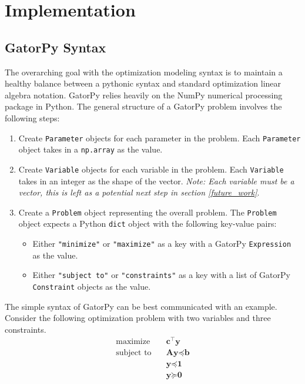 \documentclass[conference]{IEEEtran}
\begin{document}
\section{Implementation}

\subsection{GatorPy Syntax}
The overarching goal with the optimization modeling syntax is to maintain a healthy balance between a pythonic syntax and standard optimization linear algebra notation.
GatorPy relies heavily on the NumPy numerical processing package in Python.
The general structure of a GatorPy problem involves the following steps:
\begin{enumerate}
    \item Create \texttt{Parameter} objects for each parameter in the problem.
    Each \texttt{Parameter} object takes in a \texttt{np.array} as the value.
    \item Create \texttt{Variable} objects for each variable in the problem.
    Each \texttt{Variable} takes in an integer as the shape of the vector.
    \textit{Note: Each variable must be a vector, this is left as a potential next step in section \ref{future_work}}.
    \item Create a \texttt{Problem} object representing the overall problem.
    The \texttt{Problem} object expects a Python \texttt{dict} object with the following key-value pairs:
    \begin{itemize}
        \item Either \texttt{"minimize"} or \texttt{"maximize"} as a key with a GatorPy \texttt{Expression} as the value.
        \item Either \texttt{"subject to"} or \texttt{"constraints"} as a key with a list of GatorPy \texttt{Constraint} objects as the value.
    \end{itemize}
\end{enumerate}
The simple syntax of GatorPy can be best communicated with an example.
Consider the following optimization problem with two variables and three constraints.
\begin{align*}
  \text{maximize} & \quad \textbf{c}^\top \textbf{y} \\
  \text{subject to} & \quad \textbf{A} \textbf{y} \preceq \textbf{b} \\
  & \quad \textbf{y} \preceq \textbf{1} \\
  & \quad \textbf{y} \succeq \textbf{0}
\end{align*}
\end{document}
